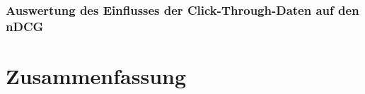 \subsubsection{Auswertung des Einflusses der Click-Through-Daten auf den nDCG}
\label{sec:Evaluation:Auswertung:Diskussion:EinflussNDCG}

\section{Zusammenfassung}
\label{sec:Evaluation:Zusammenfassung}


